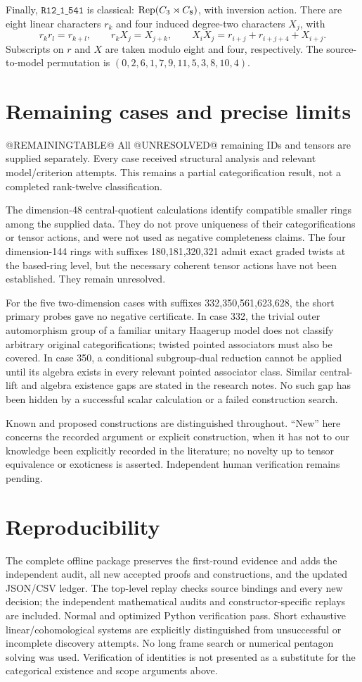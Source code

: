 \documentclass[11pt]{article}
\newcommand{\ring}[1]{\texttt{R12\_1\_#1}}
\begin{document}
Finally, $\ring{541}$ is classical: $\operatorname{Rep}(C_3\rtimes C_8)$, with inversion action.
There are eight linear characters $r_k$ and four induced degree-two characters $X_j$,
with
\[
 r_kr_l=r_{k+l},\qquad r_kX_j=X_{j+k},\qquad
 X_iX_j=r_{i+j}+r_{i+j+4}+X_{i+j}.
\]
Subscripts on $r$ and $X$ are taken modulo eight and four, respectively.
The source-to-model permutation is $(0,2,6,1,7,9,11,5,3,8,10,4)$.

\section{Remaining cases and precise limits}
@REMAININGTABLE@
All @UNRESOLVED@ remaining IDs and tensors are supplied separately. Every case
received structural analysis and relevant model/criterion attempts. This remains
a partial categorification result, not a completed rank-twelve classification.

The dimension-48 central-quotient calculations identify compatible smaller rings
among the supplied data. They do not prove uniqueness of their categorifications
or tensor actions, and were not used as negative completeness claims. The
four dimension-144 rings with suffixes 180,181,320,321 admit exact graded twists
at the based-ring level, but the necessary coherent tensor actions have not been
established. They remain unresolved.

For the five two-dimension cases with suffixes 332,350,561,623,628, the short primary
probes gave no negative certificate. In case 332, the trivial outer automorphism
group of a familiar unitary Haagerup model does not classify arbitrary original
categorifications; twisted pointed associators must also be covered. In case 350,
a conditional subgroup-dual reduction cannot be applied until its algebra exists
in every relevant pointed associator class. Similar central-lift and algebra
existence gaps are stated in the research notes. No such gap has been hidden by
a successful scalar calculation or a failed construction search.

Known and proposed constructions are distinguished throughout. ``New'' here concerns
the recorded argument or explicit construction, when it has not to our knowledge
been explicitly recorded in the literature; no novelty up to tensor equivalence
or exoticness is asserted. Independent human verification remains pending.

\section{Reproducibility}
The complete offline package preserves the first-round evidence and adds the
independent audit, all new accepted proofs and constructions, and the updated
JSON/CSV ledger. The top-level replay checks source bindings and every new
decision; the independent mathematical audits and constructor-specific replays
are included. Normal and optimized Python verification pass. Short exhaustive
linear/cohomological systems are explicitly distinguished from unsuccessful or
incomplete discovery attempts. No long frame search or numerical pentagon solving
was used. Verification of identities is not presented as a substitute for the
categorical existence and scope arguments above.
\end{document}
